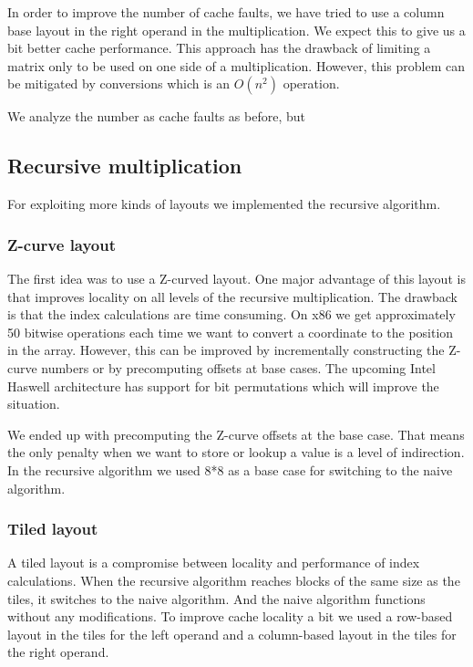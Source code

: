 In order to improve the number of cache faults, we have tried to use a
column base layout in the right operand in the multiplication. We
expect this to give us a bit better cache performance. This approach
has the drawback of limiting a matrix only to be used on one side of a
multiplication. However, this problem can be mitigated by conversions which is an $O(n^2)$ operation.

We analyze the number as cache faults as before, but 

\subsection{Recursive multiplication}

For exploiting more kinds of layouts we implemented the recursive algorithm.

\subsubsection{Z-curve layout}

The first idea was to use a Z-curved layout. One major advantage of this layout is that improves locality on all levels of the recursive multiplication. The drawback is that the index calculations are time consuming. On x86 we get approximately 50 bitwise operations each time we want to convert a coordinate to the position in the array. However, this can be improved by incrementally constructing the Z-curve numbers or by precomputing offsets at base cases. The upcoming Intel Haswell architecture has support for bit permutations which will improve the situation.

We ended up with precomputing the Z-curve offsets at the base case. That means the only penalty when we want to store or lookup a value is a level of indirection. In the recursive algorithm we used 8*8 as a base case for switching to the naive algorithm.

\subsubsection{Tiled layout}

A tiled layout is a compromise between locality and performance of index calculations. When the recursive algorithm reaches blocks of the same size as the tiles, it switches to the naive algorithm. And the naive algorithm functions without any modifications. To improve cache locality a bit we used a row-based layout in the tiles for the left operand and a column-based layout in the tiles for the right operand.

